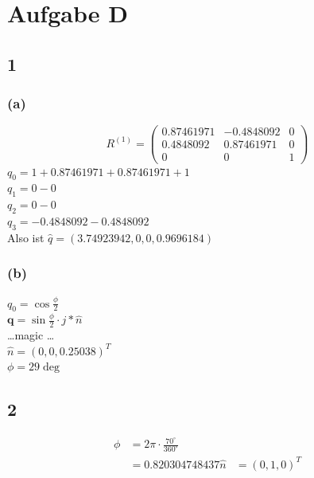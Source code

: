 \documentclass{../Vorlage/mat}
\begin{document}
\section*{Aufgabe D}
\subsection*{1}
\subsubsection*{(a)}
\begin{equation}
	R^{(1)} = \begin{pmatrix}
	0.87461971 & -0.4848092 & 0 \\
	0.4848092 & 0.87461971 & 0\\
	0&0&1
	\end{pmatrix}
\end{equation}
$q_0 = 1 + 0.87461971 + 0.87461971 + 1$\\
$q_1 = 0 - 0$\\
$q_2 = 0 - 0$\\
$q_3 = -0.4848092 - 0.4848092$\\
Also ist $\hat{q} = (3.74923942, 0, 0, 0.9696184)$
\subsubsection*{(b)}
$q_0 = \cos{\frac{\phi}{2}}$\\
$\mathbf{q} = \sin{\frac{\phi}{2}}\cdot j * \hat{n}$\\
\ldots magic \ldots\\
$\hat{n} = (0,0,0.25038)^T$\\
$\phi = 29\deg$
\subsection*{2}
\begin{align*}
\phi & = 2 \pi \cdot \frac{70^{\circ}}{360^{\circ}}\\
& = 0.820304748437 
\hat{n} & = (0,1,0)^T
\end{align*}
\end{document}
